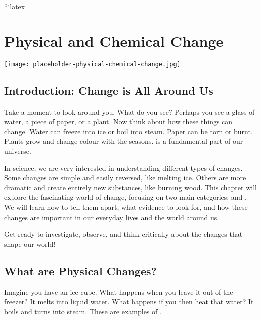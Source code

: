 ```latex
\chapter{Physical and Chemical Change}

\begin{marginfigure}
\texttt{[image: placeholder-physical-chemical-change.jpg]}
\end{marginfigure}

\section*{Introduction: Change is All Around Us}

Take a moment to look around you. What do you see?  Perhaps you see a glass of water, a piece of paper, or a plant. Now think about how these things can change. Water can freeze into ice or boil into steam. Paper can be torn or burnt. Plants grow and change colour with the seasons.   is a fundamental part of our universe.

In science, we are very interested in understanding different types of changes. Some changes are simple and easily reversed, like melting ice. Others are more dramatic and create entirely new substances, like burning wood. This chapter will explore the fascinating world of change, focusing on two main categories:  and . We will learn how to tell them apart, what evidence to look for, and how these changes are important in our everyday lives and the world around us.

\begin{marginnote}
\end{marginnote}

Get ready to investigate, observe, and think critically about the changes that shape our world!

\section{What are Physical Changes?}

Imagine you have an ice cube. What happens when you leave it out of the freezer? It melts into liquid water. What happens if you then heat that water? It boils and turns into steam. These are examples of .

